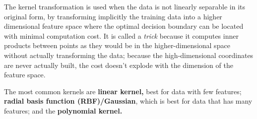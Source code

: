 \documentclass[journal]{IEEEtran}
\begin{document}
The kernel transformation is used when the data is not linearly separable in its original form, by transforming implicitly the training data into a higher dimensional feature space where the optimal decision boundary can be located with minimal computation cost. It is called a \textit{trick} because it computes inner products between points as they would be in the higher-dimensional space without actually transforming the data; because the high-dimensional coordinates are never actually built, the cost doesn't explode with the dimension of the feature space.

The most common kernels are \textbf{linear kernel,} best for data with few features; \textbf{radial basis function (RBF)/Gaussian}, which is best for data that has many features; and the \textbf{polynomial kernel.}
\\
\end{document}
